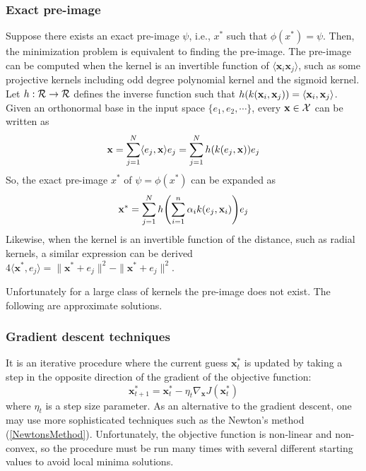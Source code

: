 \documentclass[12pt, letterpaper]{article}
\theoremstyle{definition}
\newcommand{\x}{\mathbf{x}}
\DeclarePairedDelimiter\autobracket{(}{)}
\newcommand{\br}[1]{\autobracket*{#1}}
\begin{document}
\subsubsection{Exact pre-image}
Suppose there exists an exact pre-image $\psi$, i.e., $x^*$ such that $\phi(x^*) = \psi$. Then, the minimization problem is equivalent to finding the pre-image. The pre-image can be computed when the kernel is an invertible function of $\langle \x_i \x_j \rangle$, such as some projective kernels including odd degree polynomial kernel and the sigmoid kernel. Let $h: \CMcal{R}\rightarrow \CMcal{R}$ defines the inverse function such that $h\br{k(\x_i, \x_j)} = \langle\x_i, \x_j \rangle$. Given an orthonormal base in the input space $\{e_1, e_2, \cdots\}$, every $\x \in \CMcal{X}$ can be written as 
\begin{equation}
\x = \sum_{j=1}^N\langle e_j , \x\rangle e_j = \sum_{j=1}^N h\br{k(e_j, \x)} e_j
\end{equation}
So, the exact pre-image $x^*$ of $\psi = \phi(x^*)$ can be expanded as 
\begin{equation}
\x^* =\sum_{j=1}^N h\br{\sum_{i=1}^n\alpha_i k(e_j, \x_i)} e_j
\end{equation}
Likewise, when the kernel is an invertible function of the distance, such as radial kernels, a similar expression can be derived $4 \langle \x^*, e_j \rangle = \| \x^* + e_j \|^2 -\| \x^* + e_j \|^2 $.

Unfortunately for a large class of kernels the pre-image does not exist. The following are approximate solutions.

\subsubsection{Gradient descent techniques}
It is an iterative procedure where the current guess $\x^*_t$ is updated by taking a step in the opposite direction of the gradient of the objective function:
\begin{equation}
\x^*_{t+1} = \x^*_t - \eta_t \nabla_\x J(\x_t^*)
\end{equation}
where $\eta_t$ is a step size parameter. As an alternative to the gradient descent, one may use more sophisticated techniques such as the Newton's method (\autoref{NewtonsMethod}). Unfortunately, the objective function is non-linear and non-convex, so the procedure must be run many times with several different starting values to avoid local minima solutions.
\end{document}
